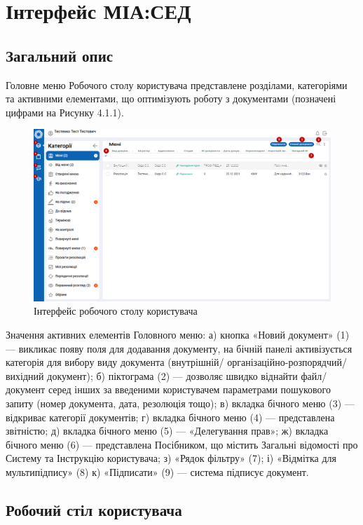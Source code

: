 \chapter{Інтерфейс МІА:СЕД}

\section{Загальний опис}

Головне меню Робочого столу користувача представлене розділами, категоріями
та активними елементами, що оптимізують роботу з документами (позначені
цифрами на Рисунку 4.1.1).

\begin{figure}[!htbp]
\centerline{\includegraphics[width=\textwidth]{img/4.1.1.png}}
\caption{Інтерфейс робочого столу користувача}
\end{figure}

Значення активних елементів Головного меню:
а) кнопка «Новий документ» (1) --- викликає появу поля для додавання
документу, на бічній панелі активізується категорія для вибору виду документа
(внутрішній/ організаційно-розпорядчий/ вихідний документ);
б) піктограма (2) --- дозволяє швидко віднайти файл/ документ серед інших за
введеними користувачем параметрами пошукового запиту (номер документа,
дата, резолюція тощо);
в) вкладка бічного меню (3) --- відкриває категорії документів;
г) вкладка бічного меню (4) --- представлена звітністю;
д) вкладка бічного меню (5) --- «Делегування прав»;
ж) вкладка бічного меню (6) --- представлена Посібником, що містить Загальні
відомості про Систему та Інструкцію користувача;
з) «Рядок фільтру» (7);
і) «Відмітка для мультипідпису» (8)
к) «Підписати» (9) --- система підписує документ.

\section{Робочий стіл користувача}

